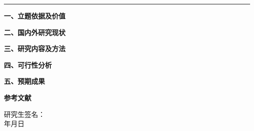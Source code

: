 \documentclass[UTF8,a4paper,zihao=-4]{ctexart}
\newcommand{\emptyline}[1][4.5cm]{\underline{\makebox[#1]{}}}
\newenvironment{reportbox}{
    \def\FrameCommand{\fboxsep=8pt\fboxrule=0.4pt\fbox}%
    \MakeFramed{\advance\hsize-\width \FrameRestore}}
    {\endMakeFramed}
\begin{document}
\vspace{-\arrayrulewidth}
\noindent
\begin{reportbox}
	\begin{center}
		\vspace{0.45em}
	\end{center}
	
	\vspace{-0.2em}
	\hrule
	\vspace{0.8em}
	
	\begingroup
	\setlength{\leftskip}{0.6em}
	\setlength{\rightskip}{0.6em}
	\setlength{\parindent}{2em}
	\setlength{\parskip}{0.06em}
	\vspace{0.25em}
	\noindent\textbf{一、立题依据及价值}
	\vspace{0.25em}
        
        \lipsum[1]
        
        \noindent\textbf{二、国内外研究现状}
        
        \lipsum[1-3]
        
        \noindent\textbf{三、研究内容及方法}
        
        \lipsum[1-3]
        
        \noindent\textbf{四、可行性分析}
        
        \lipsum[1-3]
        
        \noindent\textbf{五、预期成果}
        
        \lipsum[1]
        \cite{zhang2023ev}
        \cite{wang2021evol}
        
        \vspace{0.8em}
            \noindent \textbf{参考文献}
            
            \vspace{0.3em}
            \noindent
            \setlength{\bibsep}{0pt}
            
            
        
        
        \vfill
        \begin{flushright}
            \hspace*{\fill}
            \begin{minipage}{6.2cm}
                研究生签名：\emptyline[3.5cm]\\[0.8em]
                \hspace*{3.6cm}年\hspace{1.5em}月\hspace{1.5em}日
            \end{minipage}
        \end{flushright}
        \vspace{0.4em}
    \endgroup
\end{reportbox}
\end{document}
